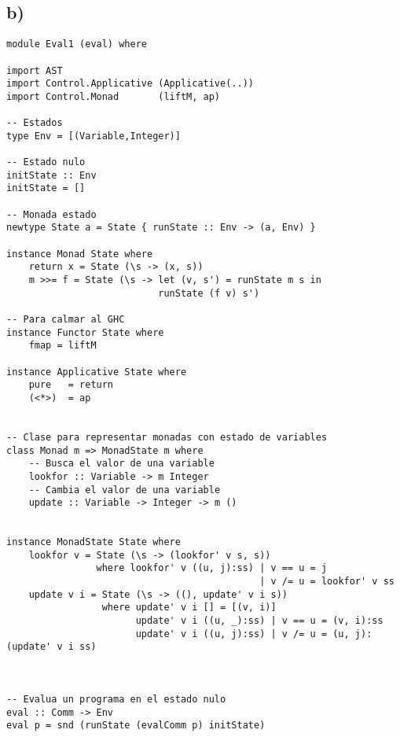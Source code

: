 \documentclass[a4paper]{report}
\begin{document}
\subsection*{b)}
\begin{lstlisting}
module Eval1 (eval) where

import AST
import Control.Applicative (Applicative(..))
import Control.Monad       (liftM, ap)  

-- Estados
type Env = [(Variable,Integer)]

-- Estado nulo
initState :: Env
initState = []

-- Monada estado
newtype State a = State { runState :: Env -> (a, Env) }

instance Monad State where
    return x = State (\s -> (x, s))
    m >>= f = State (\s -> let (v, s') = runState m s in
                           runState (f v) s')

-- Para calmar al GHC
instance Functor State where
    fmap = liftM
 
instance Applicative State where
    pure   = return
    (<*>)  = ap      


-- Clase para representar monadas con estado de variables
class Monad m => MonadState m where
    -- Busca el valor de una variable
    lookfor :: Variable -> m Integer
    -- Cambia el valor de una variable
    update :: Variable -> Integer -> m ()


instance MonadState State where
    lookfor v = State (\s -> (lookfor' v s, s))
                where lookfor' v ((u, j):ss) | v == u = j
                                             | v /= u = lookfor' v ss
    update v i = State (\s -> ((), update' v i s))
                 where update' v i [] = [(v, i)]
                       update' v i ((u, _):ss) | v == u = (v, i):ss
                       update' v i ((u, j):ss) | v /= u = (u, j):(update' v i ss)



-- Evalua un programa en el estado nulo
eval :: Comm -> Env
eval p = snd (runState (evalComm p) initState)

\end{lstlisting}
\pagebreak
\end{document}

